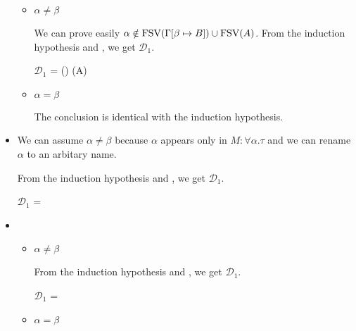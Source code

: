 \begin{itemize}
	      \begin{itemize}
	      		      	
	      	\item $\alpha \neq \beta$
	      	      	      	      
	      	      We can prove easily $\alpha \notin \text{FSV}(\Gamma[\beta \mapsto B]) \cup \text{FSV}(A)$.
	      	      From the induction hypothesis and \QGen, we get $\mathcal{D}_1$.
	      	      	      	      
	      	      $\mathcal{D}_1$ = 
	      	      { \andalso \alpha \notin \FTV(\GG) \cup \FTV(A)}
	      	      	      	      
	      	\item $\alpha = \beta$
	      	      	      	      
	      	      The conclusion is identical with the induction hypothesis.
	      	      	      	      
	      \end{itemize}
	      	      
	\item \QIns
	      	      
	      We can assume $\alpha \neq \beta$ because $\alpha$ appears only in $M:\forall\alpha.\tau$ and we can rename $\alpha$ to an arbitary name.
	      	      
	      From the induction hypothesis and \QIns, we get $\mathcal{D}_1$.
	      	      
	      $\mathcal{D}_1$ = 
	      {}
	      	      
	\item \QCsp
	      	      
	      \begin{itemize}
	      		      	
	      	\item $\alpha \neq \beta$
	      	      	      	      
	      	      From the induction hypothesis and \QCsp, we get $\mathcal{D}_1$.
	      	      	      	      
	      	      $\mathcal{D}_1$ = 
	      	      {}
	      	      	      	      
	      	\item $\alpha = \beta$
	      	      	      	      

\end{itemize}
\end{itemize}
